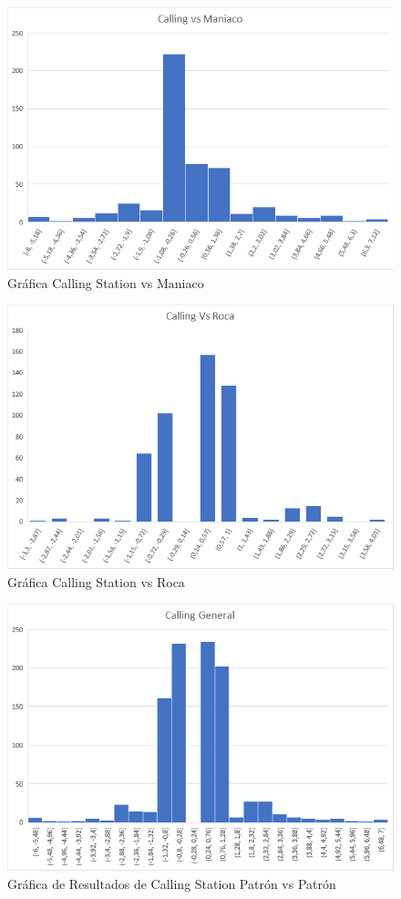 \begin{figure}[h]
\centering
\includegraphics[width=.65\textwidth]{figuras/CvM.png}   
\caption{Gráfica Calling Station vs Maniaco}
\label{fig:CvM}
\end{figure}

\begin{figure}[h]
\centering
\includegraphics[width=.65\textwidth]{figuras/CvR.png}   
\caption{Gráfica Calling Station vs Roca}
\label{fig:CvR}
\end{figure}

\begin{figure}[h]
\centering
\includegraphics[width=.65\textwidth]{figuras/CG.png}   
\caption{Gráfica de Resultados de Calling Station Patrón vs Patrón}
\label{fig:CGR}
\end{figure}

